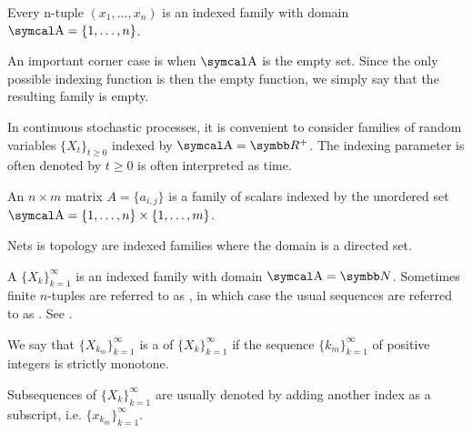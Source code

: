 \begin{example}\label{ex:indexed_families}
  \mbox{}
  \begin{defenum}
    \item Every n-tuple \( (x_1, \ldots, x_n) \) is an indexed family with domain \( \CA = \{ 1, \ldots, n \} \).

    \item An important corner case is when \( \CA \) is the empty set. Since the only possible indexing function is then the empty function, we simply say that the resulting family is empty.

    \item In continuous stochastic processes, it is convenient to consider families of random variables \( \{ X_t \}_{t \geq 0} \) indexed by \( \CA = \BR^+ \). The indexing parameter is often denoted by \( t \geq 0 \) is often interpreted as time.

    \item An \( n \times m \) matrix \( A = \{ a_{i,j} \} \) is a family of scalars indexed by the unordered set \( \CA = \{ 1, \ldots, n \} \times \{ 1, \ldots, m \} \).

    \item Nets is topology are indexed families where the domain is a directed set.
  \end{defenum}
\end{example}

\begin{definition}\label{def:sequence}
  A  \( \{ X_k \}_{k=1}^\infty \) is an indexed family with domain \( \CA = \BN \). Sometimes finite \( n \)-tuples are referred to as , in which case the usual sequences are referred to as . See .

  We say that \( \{ X_{k_m} \}_{k=1}^\infty \) is a  of \( \{ X_k \}_{k=1}^\infty \) if the sequence \( \{ k_m \}_{k=1}^\infty \) of positive integers is strictly monotone.

  Subsequences of \( \{ X_k \}_{k=1}^\infty \) are usually denoted by adding another index as a subscript, i.e. \( \{ x_{k_m} \}_{k=1}^\infty \).
\end{definition}

